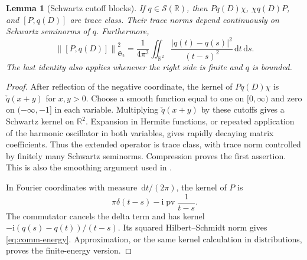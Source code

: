 \documentclass[11pt]{article}
\numberwithin{equation}{section}
\newtheorem{lemma}[theorem]{Lemma}
\theoremstyle{definition}
\theoremstyle{remark}
\newcommand{\Sch}{\mathcal S}
\newcommand{\ii}{\mathrm i}
\newcommand{\Stwo}{\mathfrak S_2}
\newcommand{\norm}[1]{\left\lVert #1\right\rVert}
\newcommand{\dd}{\,\mathrm d}
\begin{document}
\begin{lemma}[Schwartz cutoff blocks]\label{lem:hankel}
If \(q\in\Sch(\mathbb R)\), then \(Pq(D)\chi\),
\(\chi q(D)P\), and \([P,q(D)]\) are trace class.
Their trace norms depend continuously on Schwartz seminorms of \(q\).
Furthermore,
\begin{equation}\label{eq:comm-energy}
\norm{[P,q(D)]}_{\Stwo}^2
=\frac1{4\pi^2}\iint_{\mathbb R^2}
\frac{|q(t)-q(s)|^2}{(t-s)^2}\dd t\dd s.
\end{equation}
The last identity also applies whenever the right side is finite and
\(q\) is bounded.
\end{lemma}
\begin{proof}
After reflection of the negative coordinate, the kernel of
\(Pq(D)\chi\) is \(\check q(x+y)\) for \(x,y>0\).
Choose a smooth function equal to one on \([0,\infty)\) and zero
on \((-\infty,-1]\) in each variable. Multiplying
\(\check q(x+y)\) by these cutoffs gives a Schwartz kernel on
\(\mathbb R^2\). Expansion in Hermite functions, or repeated application
of the harmonic oscillator in both variables, gives rapidly decaying
matrix coefficients. Thus the extended operator is trace class, with
trace norm controlled by finitely many Schwartz seminorms.
Compression proves the first assertion. This is also the smoothing
argument used in \cite[Appendix D]{CCWeil}.

In Fourier coordinates with measure \(\dd t/(2\pi)\), the kernel of
\(P\) is
\[
\pi\delta(t-s)-\ii\operatorname{pv}\frac1{t-s}.
\]
The commutator cancels the delta term and has kernel
\(-\ii(q(s)-q(t))/(t-s)\). Its squared Hilbert--Schmidt norm gives
\eqref{eq:comm-energy}. Approximation, or the same kernel calculation
in distributions, proves the finite-energy version.
\end{proof}
\end{document}
